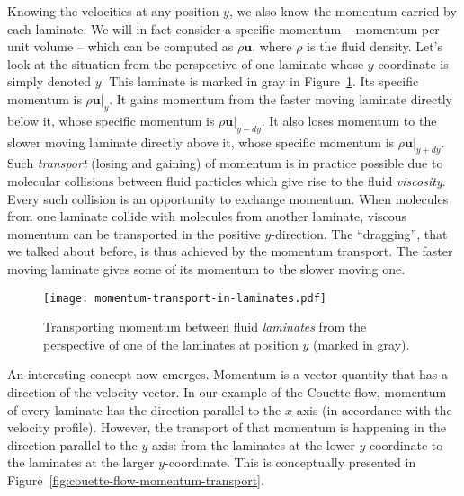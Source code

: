 \documentclass[10pt,twocolumn]{article}
\begin{document}
Knowing the velocities at any position $y$, we also know the momentum carried by each laminate. We will in fact consider a specific momentum -- momentum per unit volume -- which can be computed as $\rho \mathbf{u}$, where $\rho$ is the fluid density. Let's look at the situation from the perspective of one laminate whose $y$-coordinate is simply denoted $y$. This laminate is marked in gray in Figure~\ref{fig:momentum-transport-in-laminates}. Its specific momentum is $\rho \mathbf{u}|_{y}$. It gains momentum from the faster moving laminate directly below it, whose specific momentum is $\rho \mathbf{u}|_{y-dy}$. It also loses momentum to the slower moving laminate directly above it, whose specific momentum is $\rho \mathbf{u}|_{y+dy}$. Such \textit{transport} (losing and gaining) of momentum is in practice possible due to molecular collisions between fluid particles which give rise to the fluid \textit{viscosity}. Every such collision is an opportunity to exchange momentum. When molecules from one laminate collide with molecules from another laminate, viscous momentum can be transported in the positive $y$-direction. The ``dragging'', that we talked about before, is thus achieved by the momentum transport. The faster moving laminate gives some of its momentum to the slower moving one.

\begin{figure}[t!]
\centering\texttt{[image: momentum-transport-in-laminates.pdf]}
\caption{Transporting momentum between fluid \textit{laminates} from the perspective of one of the laminates at position $y$ (marked in gray).}
\label{fig:momentum-transport-in-laminates}
\end{figure}



An interesting concept now emerges. Momentum is a vector quantity that has a direction of the velocity vector. In our example of the Couette flow, momentum of every laminate has the direction parallel to the $x$-axis (in accordance with the velocity profile). However, the transport of that momentum is happening in the direction parallel to the $y$-axis: from the laminates at the lower $y$-coordinate to the laminates at the larger $y$-coordinate. This is conceptually presented in Figure~\ref{fig:couette-flow-momentum-transport}. 
\end{document}
